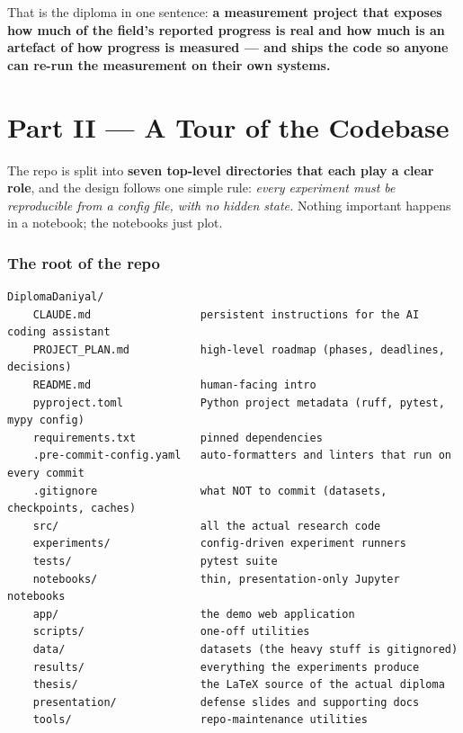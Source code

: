 \documentclass[11pt,a4paper]{article}
\begin{document}
That is the diploma in one sentence: \textbf{a measurement project that exposes how much of the field's reported progress is real and how much is an artefact of how progress is measured --- and ships the code so anyone can re-run the measurement on their own systems.}

\clearpage

\part*{Part II --- A Tour of the Codebase}

The repo is split into \textbf{seven top-level directories that each play a clear role}, and the design follows one simple rule: \emph{every experiment must be reproducible from a config file, with no hidden state.} Nothing important happens in a notebook; the notebooks just plot.

\section{The root of the repo}

\begin{Verbatim}
DiplomaDaniyal/
    CLAUDE.md                 persistent instructions for the AI coding assistant
    PROJECT_PLAN.md           high-level roadmap (phases, deadlines, decisions)
    README.md                 human-facing intro
    pyproject.toml            Python project metadata (ruff, pytest, mypy config)
    requirements.txt          pinned dependencies
    .pre-commit-config.yaml   auto-formatters and linters that run on every commit
    .gitignore                what NOT to commit (datasets, checkpoints, caches)
    src/                      all the actual research code
    experiments/              config-driven experiment runners
    tests/                    pytest suite
    notebooks/                thin, presentation-only Jupyter notebooks
    app/                      the demo web application
    scripts/                  one-off utilities
    data/                     datasets (the heavy stuff is gitignored)
    results/                  everything the experiments produce
    thesis/                   the LaTeX source of the actual diploma
    presentation/             defense slides and supporting docs
    tools/                    repo-maintenance utilities
\end{Verbatim}
\end{document}
